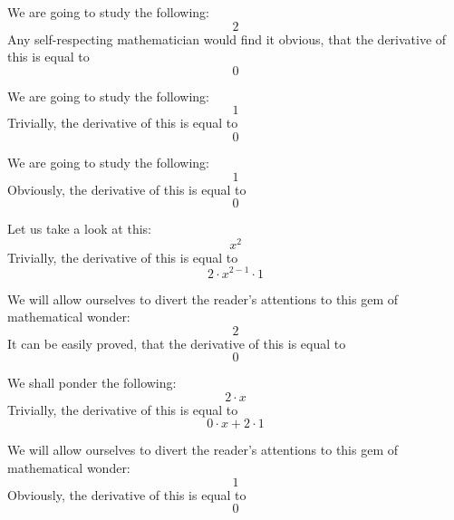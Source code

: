 \documentclass{article}
\begin{document}
We are going to study the following:
\begin{equation}
2 
\end{equation}
Any self-respecting mathematician would find it obvious, that the derivative of this is equal to
\begin{equation}
0 
\end{equation}

We are going to study the following:
\begin{equation}
1 
\end{equation}
Trivially, the derivative of this is equal to
\begin{equation}
0 
\end{equation}

We are going to study the following:
\begin{equation}
1 
\end{equation}
Obviously, the derivative of this is equal to
\begin{equation}
0 
\end{equation}

Let us take a look at this:
\begin{equation}
x ^{2 } 
\end{equation}
Trivially, the derivative of this is equal to
\begin{equation}
2 \cdot x ^{2 - 1 } \cdot 1 
\end{equation}

We will allow ourselves to divert the reader's attentions to this gem of mathematical wonder:
\begin{equation}
2 
\end{equation}
It can be easily proved, that the derivative of this is equal to
\begin{equation}
0 
\end{equation}

We shall ponder the following:
\begin{equation}
2 \cdot x 
\end{equation}
Trivially, the derivative of this is equal to
\begin{equation}
0 \cdot x + 2 \cdot 1 
\end{equation}

We will allow ourselves to divert the reader's attentions to this gem of mathematical wonder:
\begin{equation}
1 
\end{equation}
Obviously, the derivative of this is equal to
\begin{equation}
0 
\end{equation}
\end{document}
